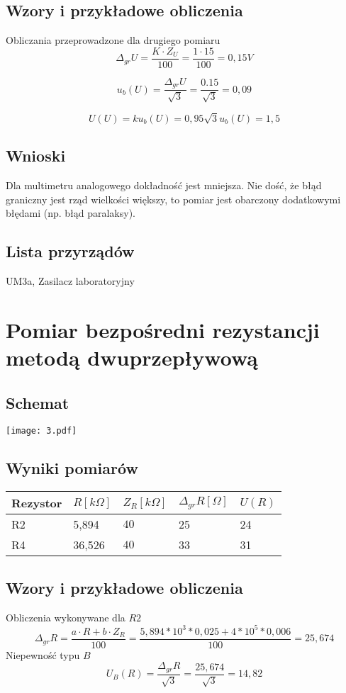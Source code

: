 \documentclass[11pt]{article}
\begin{document}
\subsection{Wzory i przykładowe obliczenia}
Obliczania przeprowadzone dla drugiego pomiaru
$$ \Delta_{gr}U = \frac{K \cdot Z_U}{100} = \frac{1 \cdot 15}{100} = 0,15 V$$

$$ u_b(U) = \frac{\Delta_{gr}U}{\sqrt{3}} = \frac{0.15}{\sqrt{3}} = 0,09 $$

$$ U(U) = k u_b(U) = 0,95 \sqrt{3} u_b(U) = 1,5 $$
\subsection{Wnioski}
Dla multimetru analogowego dokładność jest mniejsza. Nie dość, że błąd graniczny jest rząd wielkości większy, to pomiar jest obarczony dodatkowymi błędami (np. błąd paralaksy).
\subsection{Lista przyrządów}
UM3a, Zasilacz laboratoryjny

\newpage
\section{Pomiar bezpośredni rezystancji metodą dwuprzepływową} 
\subsection{Schemat}
\begin{center}
\texttt{[image: 3.pdf]}
\end{center}
\subsection{Wyniki pomiarów}
\begin{center}
\begin{tabular}{|l|l|l|l|l|}
\hline
	 Rezystor & $R[k\Omega]$ & $Z_R[k\Omega]$ & $\Delta_{gr}R [\Omega]$ & $U(R)$\\
\hline
	R2 & 5,894 & $40$ & 25 & 24\\
\hline
	R4 & 36,526 & $40$ & 33 & 31\\
\hline
\end{tabular}
\end{center}
\subsection{Wzory i przykładowe obliczenia}
Obliczenia wykonywane dla $R2$
$$\Delta_{gr}R = \frac{a \cdot R + b \cdot Z_R}{100} = 
	\frac{5,894 *10^3 * 0,025 + 4*10^5*0,006}{100} = 25,674$$
Niepewność typu $B$ 
$$ U_B(R) = \frac{\Delta_{gr}R}{\sqrt{3}} = \frac{25,674}{\sqrt{3}} = 14,82 $$
\end{document}

